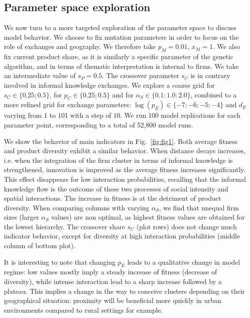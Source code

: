 \documentclass[letterpaper]{article}
\begin{document}
\subsection{Parameter space exploration}

We now turn to a more targeted exploration of the parameter space to discuss model behavior. We choose to fix mutation parameters in order to focus on the role of exchanges and geography. We therefore take $p_M = 0.01$, $x_M = 1$. We also fix current product share, as it is similarly a specific parameter of the genetic algorithm, and in terms of thematic interpretation is internal to firms. We take an intermediate value of $s_P = 0.5$. The crossover parameter $s_C$ is in contrary involved in informal knowledge exchanges. We explore a coarse grid for $s_C \in \{0.25 ; 0.5\}$, for $p_C \in \{0.25 ; 0.5\}$ and for $\alpha_S \in \{0.1 : 1.0 : 2.0\}$, combined to a more refined grid for exchange parameters: $\log (p_E) \in \{-7 ; -6 ; -5 ; -4\}$ and $d_E$ varying from 1 to 101 with a step of $10$. We run 100 model replications for each parameter point, corresponding to a total of 52,800 model runs.

We show the behavior of main indicators in Fig.~\ref{fig:fig1}. Both average fitness and product diversity exhibit a similar behavior. When distance decays increases, i.e. when the integration of the firm cluster in terms of informal knowledge is strengthened, innovation is improved as the average fitness increases significantly. This effect disappears for low interaction probabilities, recalling that the informal knowledge flow is the outcome of these two processes of social intensity and spatial interactions. The increase in fitness is at the detriment of product diversity. When comparing columns with varying $\alpha_S$, we find that unequal firm sizes (larger $\alpha_S$ values) are non optimal, as highest fitness values are obtained for the lowest hierarchy. The crossover share $s_C$ (plot rows) does not change much indicator behavior, except for diversity at high interaction probabilities (middle column of bottom plot).

It is interesting to note that changing $p_E$ leads to a qualitative change in model regime: low values mostly imply a steady increase of fitness (decrease of diversity), while intense interaction lead to a sharp increase followed by a plateau. This implies a change in the way to conceive clusters depending on their geographical situation: proximity will be beneficial more quickly in urban environments compared to rural settings for example.
\end{document}
